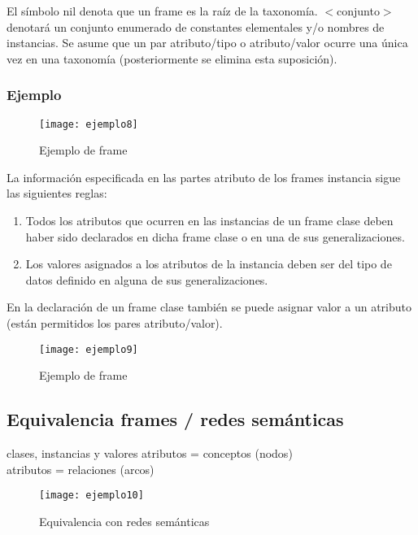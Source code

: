 \documentclass[12pt]{article}
\begin{document}
El símbolo nil denota que un frame es la raíz de la taxonomía. $<$conjunto$>$ denotará un conjunto enumerado de constantes elementales y/o nombres de instancias. Se asume que un par atributo/tipo o atributo/valor ocurre una única vez en una taxonomía (posteriormente se elimina esta suposición).

\subsubsection{Ejemplo}
\begin{figure}[H]
\centering
\texttt{[image: ejemplo8]}
\caption{Ejemplo de frame} \label{fig:ejemplo8}
\end{figure}

La información especificada en las partes atributo de los frames instancia sigue las siguientes reglas:
\begin{enumerate}
\item Todos los atributos que ocurren en las instancias de un frame clase deben haber sido declarados en dicha frame clase o en una de sus generalizaciones.
\item Los valores asignados a los atributos de la instancia deben ser del tipo de datos definido en alguna de sus generalizaciones.
\end{enumerate}

En la declaración de un frame clase también se puede asignar valor a un atributo (están permitidos los pares atributo/valor).

\begin{figure}[H]
\centering
\texttt{[image: ejemplo9]}
\caption{Ejemplo de frame} \label{fig:ejemplo9}
\end{figure}

\subsection{Equivalencia frames / redes semánticas}
clases, instancias y valores atributos = conceptos (nodos)\\
atributos = relaciones (arcos)

\begin{figure}[H]
\centering
\texttt{[image: ejemplo10]}
\caption{Equivalencia con redes semánticas}
\label{fig:ejemplo10}
\end{figure}
\end{document}
